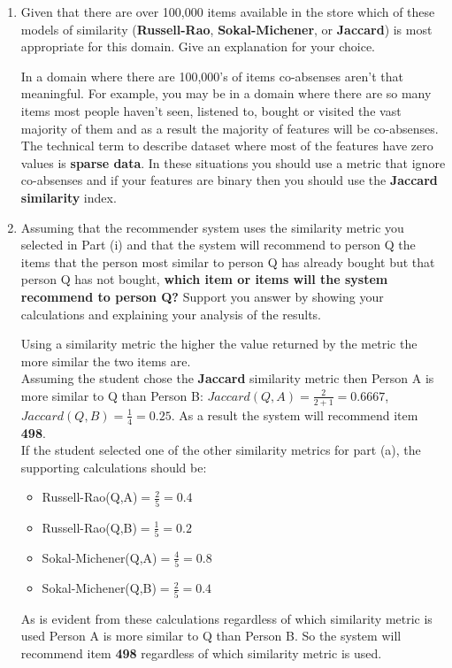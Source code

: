 \documentclass[solution]{ditpaper}
\begin{document}
\begin{enumerate}
	\begin{enumerate}
			\item Given that there are over 100,000 items available in the store which of these models of similarity (\textbf{Russell-Rao}, \textbf{Sokal-Michener}, or \textbf{Jaccard}) is most appropriate for this domain. Give an explanation for your choice.
	\begin{answer}
In a domain where there are 100,000's of items co-absenses aren't that meaningful. For example, you may be in a domain where there are so many items most people haven't seen, listened to, bought or visited the vast majority of them and as a result the majority of features will be co-absenses. The technical term to describe dataset where most of the features have zero values is \textbf{sparse data}. In these situations you should use a metric that ignore co-absenses and if your features are binary then you should use the \textbf{Jaccard similarity} index. 
	\end{answer}
			\item Assuming that the recommender system uses the similarity metric you selected in Part (i) and that the system will recommend to person Q the items that the person most similar to person Q has already bought but that person Q has not bought, \textbf{which item or items will the system recommend to person Q?} Support you answer by showing your calculations and explaining your analysis of the results.
	\begin{answer}
		Using a similarity metric the higher the value returned by the metric the more similar the two items are.\\
		Assuming the student chose the \textbf{Jaccard} similarity metric then Person A is more similar to Q than Person B: $Jaccard(Q,A) = \frac{2}{2+1}= 0.6667$, $Jaccard(Q,B) = \frac{1}{4}= 0.25$. As a result the system will recommend item \textbf{498}.\\
		If the student selected one of the other similarity metrics for part (a), the supporting calculations should be:
\begin{itemize}
	\item Russell-Rao(Q,A)$=\frac{2}{5}= 0.4$
	\item Russell-Rao(Q,B)$=\frac{1}{5}= 0.2$
	\item Sokal-Michener(Q,A)$=\frac{4}{5}= 0.8$
	\item Sokal-Michener(Q,B)$=\frac{2}{5}= 0.4$	
\end{itemize}
		As is evident from these calculations regardless of which similarity metric is used Person A is more similar to Q than Person B. So the system will recommend item \textbf{498} regardless of which similarity metric is used.
	\end{answer}


\end{enumerate}
\end{enumerate}
\end{document}
